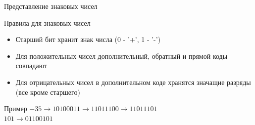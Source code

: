 \documentclass{beamer}
\begin{document}
    \begin{frame}{Представление знаковых чисел}
        \begin{block}{Правила для знаковых чисел}
            \begin{itemize}
                \item Старший бит хранит знак числа (0 - '+', 1 - '-')
                \item Для положительных чисел дополнительный, обратный и прямой коды совпадают
                \item Для отрицательных чисел в дополнительном коде хранятся значащие разряды (все кроме старшего)
            \end{itemize}
        \end{block}
        \begin{block}{Пример}
        $-35 \to 10100011 \to 11011100 \to 11011101$ \\
        $ 101 \to 01100101$
        \end{block}
    \end{frame}
\end{document}
